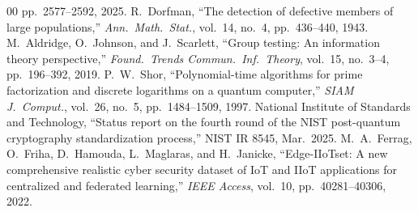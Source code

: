 \documentclass[conference]{IEEEtran}
\begin{document}
\begin{thebibliography}{00}
pp.\ 2577--2592, 2025.
 R.\ Dorfman, ``The detection of defective members of large
populations,'' \emph{Ann.\ Math.\ Stat.}, vol.\ 14, no.\ 4, pp.\ 436--440, 1943.
 M.\ Aldridge, O.\ Johnson, and J.\ Scarlett, ``Group
testing: An information theory perspective,'' \emph{Found.\ Trends Commun.\ Inf.\
Theory}, vol.\ 15, no.\ 3--4, pp.\ 196--392, 2019.
 P.\ W.\ Shor, ``Polynomial-time algorithms for prime
factorization and discrete logarithms on a quantum computer,'' \emph{SIAM
J.\ Comput.}, vol.\ 26, no.\ 5, pp.\ 1484--1509, 1997.
 National Institute of Standards and Technology, ``Status report
on the fourth round of the NIST post-quantum cryptography standardization process,''
NIST IR 8545, Mar.\ 2025.
 M.\ A.\ Ferrag, O.\ Friha, D.\ Hamouda, L.\ Maglaras, and
H.\ Janicke, ``Edge-IIoTset: A new comprehensive realistic cyber security dataset
of IoT and IIoT applications for centralized and federated learning,'' \emph{IEEE
Access}, vol.\ 10, pp.\ 40281--40306, 2022.
\end{thebibliography}
\end{document}
